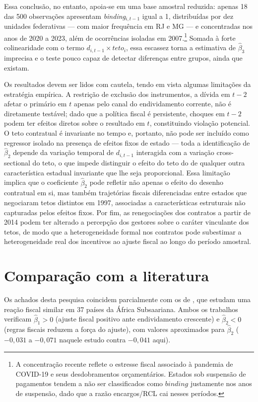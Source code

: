 Essa conclusão, no entanto, apoia-se em uma base amostral reduzida: apenas 18 das 500 observações apresentam \textit{binding}$_{i,t-1}$ igual a 1, distribuídas por dez unidades federativas --- com maior frequência em RJ e MG --- e concentradas nos anos de 2020 a 2023, além de ocorrências isoladas em 2007.\footnote{A concentração recente reflete o estresse fiscal associado à pandemia de COVID-19 e seus desdobramentos orçamentários. Estados sob suspensão de pagamentos tendem a não ser classificados como $binding$ justamente nos anos de suspensão, dado que a razão encargos/RCL cai nesses períodos.} Somada à forte colinearidade com o termo $d_{i,t-1} \times teto_i$, essa escassez torna a estimativa de $\hat{\beta}_3$ imprecisa e o teste pouco capaz de detectar diferenças entre grupos, ainda que existam.

Os resultados devem ser lidos com cautela, tendo em vista algumas limitações da estratégia empírica. A restrição de exclusão dos instrumentos, a dívida em $t-2$ afetar o primário em $t$ apenas pelo canal do endividamento corrente, não é diretamente testável; dado que a política fiscal é persistente, choques em $t-2$ podem ter efeitos diretos sobre o resultado em $t$, constituindo violação potencial. O teto contratual é invariante no tempo e, portanto, não pode ser incluído como regressor isolado na presença de efeitos fixos de estado --- toda a identificação de $\hat{\beta}_2$ depende da variação temporal de $d_{i,t-1}$ interagida com a variação cross-sectional do teto, o que impede distinguir o efeito do teto do de qualquer outra característica estadual invariante que lhe seja proporcional. Essa limitação implica que o coeficiente $\hat{\beta}_2$ pode refletir não apenas o efeito do desenho contratual em si, mas também trajetórias fiscais diferenciadas entre estados que negociaram tetos distintos em 1997, associadas a características estruturais não capturadas pelos efeitos fixos. Por fim, as renegociações dos contratos a partir de 2014 podem ter alterado a percepção dos gestores sobre o caráter vinculante dos tetos, de modo que a heterogeneidade formal nos contratos pode subestimar a heterogeneidade real dos incentivos ao ajuste fiscal ao longo do período amostral.

\section{Comparação com a literatura}
\label{sec:comparacao}

Os achados desta pesquisa coincidem parcialmente com os de , que estudam uma reação fiscal similar em 37 países da África Subsaariana. Ambos os trabalhos verificam $\hat{\beta}_1 > 0$ (ajuste fiscal positivo ante endividamento crescente) e $\hat{\beta}_2 < 0$ (regras fiscais reduzem a força do ajuste), com valores aproximados para $\hat{\beta}_2$ ($-0{,}031$ a $-0{,}071$ naquele estudo contra $-0{,}041$ aqui).

